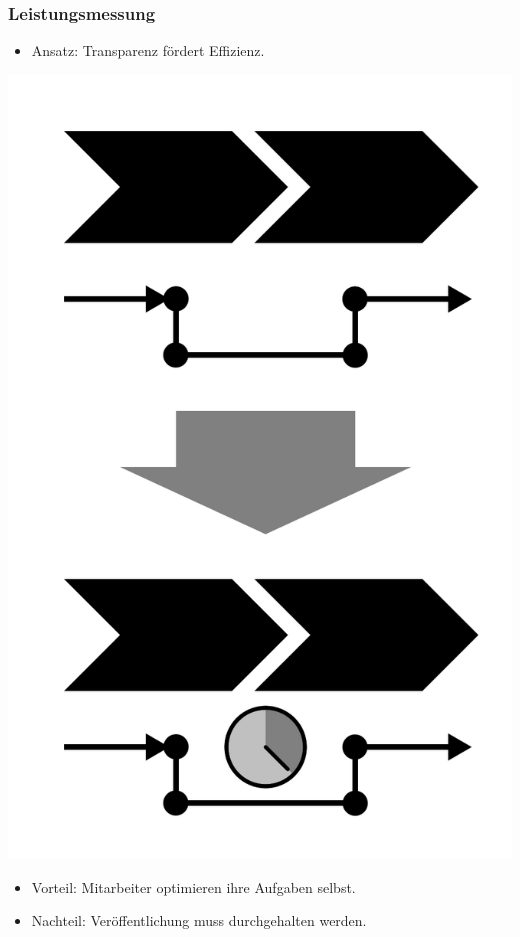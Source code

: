 \documentclass{beamer}
\begin{document}
 \begin{frame}
  \frametitle{Leistungsmessung}
   \begin{itemize}
    \item Ansatz: Transparenz fördert Effizienz.
   \end{itemize}
  \centerline{\includegraphics[scale=2.5]{4_6_10.png}}
  \begin{itemize}
    \item Vorteil: Mitarbeiter optimieren ihre Aufgaben selbst.
    \item Nachteil: Veröffentlichung muss durchgehalten werden.
  \end{itemize}
 \end{frame}
\end{document}
